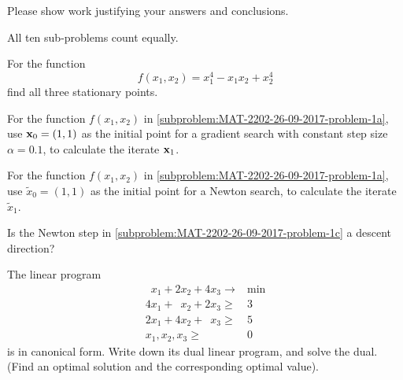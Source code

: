 \titlebox[english]

Please show work justifying your answers and conclusions.

All ten sub-problems count equally.

\vspace{-0.25cm}
\Problem
    
\begin{subproblem}
    \label{subproblem:MAT-2202-26-09-2017-problem-1a}
    For the function
    \begin{equation}
        f(x_1, x_2) = x_1^4 - x_1 x_2 + x_2^4
    \end{equation}
    find all three stationary points.
\end{subproblem}

\begin{subproblem}
    For the function $f(x_1,x_2)$ in \cref{subproblem:MAT-2202-26-09-2017-problem-1a}, use
    $\mathbf{x}_0 = (1, 1)$ as the initial point for a gradient search with constant step size $\alpha = \num{0.1}$, to calculate the iterate $\mathbf{x}_1$.
\end{subproblem}

\begin{subproblem}
    \label{subproblem:MAT-2202-26-09-2017-problem-1c}
    For the function $f(x_1, x_2)$ in \cref{subproblem:MAT-2202-26-09-2017-problem-1a}, use
    $\widetilde{x}_0 = (1,1)$ as the initial point for a 
    Newton search, to calculate the iterate $\widetilde{x}_1$. 
\end{subproblem}

\begin{subproblem}
    Is the Newton step in \cref{subproblem:MAT-2202-26-09-2017-problem-1c} a descent direction?
\end{subproblem}

\vspace{-0.25cm}
\Problem

\begin{subproblem}
    \label{subproblem:MAT-2202-26-09-2017-4a}
    The linear program
    \begin{align*}
        \phantom{2}x_1 + 2 x_2 + 4x_3 \to &\min \\
        4x_1 + \phantom{2}x_2 + 2x_3 \geq{}&{}3 \\
        2x_1 + 4x_2 + \phantom{4}x_3 \geq{}&{}5 \\
        x_1, x_2,x_3 \geq{}&{}0 
    \end{align*}
    is in canonical form. Write down its dual linear program, and solve the dual.
    (Find an optimal solution and the corresponding optimal value).
\end{subproblem}

